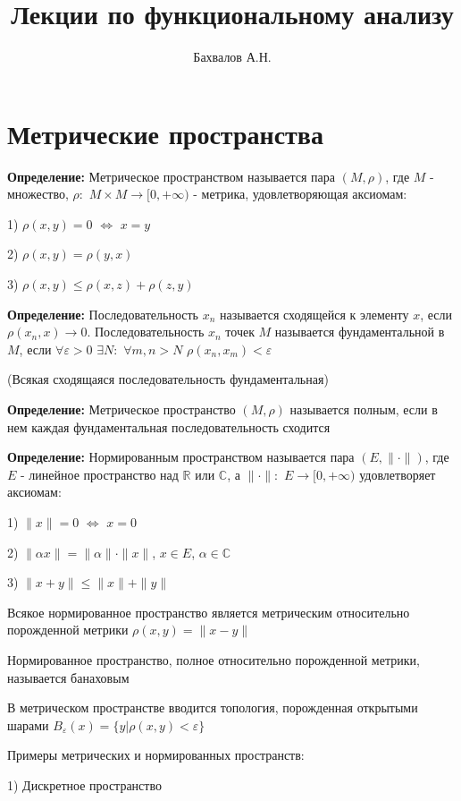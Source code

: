 \documentclass[a4paper]{report}
\author{Бахвалов А.Н.}
\title{Лекции по функциональному анализу}
\begin{document}
\maketitle
\chapter{Метрические пространства}

\noindent\textbf{Определение:} Метрическое пространством называется пара $(M,\rho)$, где $M$ - множество, $\rho:$
$M\times M\to[0,+\infty)$ - метрика, удовлетворяющая аксиомам:

1) $\rho(x,y)=0$ $\Leftrightarrow$ $x=y$

2) $\rho(x,y)=\rho(y,x)$

3) $\rho(x,y)\le\rho(x,z)+\rho(z,y)$
\bigskip

\noindent\textbf{Определение:} Последовательность ${x_n}$ называется сходящейся к элементу $x$, если $\rho(x_n,x)\to0$.
Последовательность ${x_n}$ точек $M$ называется фундаментальной в $M$, если $\forall\varepsilon>0$ $\exists N:$ $\forall
m,n>N$ $\rho(x_n,x_m)<\varepsilon$

(Всякая сходящаяся последовательность фундаментальная)
\bigskip

\noindent\textbf{Определение:} Метрическое пространство $(M,\rho)$  называется полным, если в нем каждая фундаментальная
последовательность сходится
\bigskip

\noindent\textbf{Определение:} Нормированным пространством называется пара $(E,\|\cdot\|)$, где $E$ -
линейное пространство над $\mathbb R$ или $\mathbb C$, а $\|\cdot\|:$ $E\to[0,+\infty)$ удовлетворяет аксиомам:

1) $\|x\|=0$ $\Leftrightarrow$ $x=0$

2) $\|\alpha x\|=\|\alpha\|\cdot\| x\|$, $x\in E$, $\alpha\in\mathbb C$

3) $\|x+y\|\le\|x\|+\|y\|$
\bigskip

Всякое нормированное пространство является метрическим относительно порожденной метрики $\rho(x,y)=\|x-y\|$

Нормированное пространство, полное относительно порожденной метрики, называется банаховым

В метрическом пространстве вводится топология, порожденная открытыми шарами $B_\varepsilon(x)=\{y|\rho(x,y)<\varepsilon\}$
\bigskip

\noindent Примеры метрических и нормированных пространств:

1) Дискретное пространство
\end{document}
